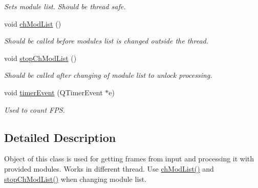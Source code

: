 \begin{DoxyCompactItemize}
\begin{DoxyCompactList}\small\item\em Sets module list. Should be thread safe. \item\end{DoxyCompactList}\item 
\hypertarget{class_image_processor_a76a8fc6e9f5e7f9883d69c5c0a607767}{
void \hyperlink{class_image_processor_a76a8fc6e9f5e7f9883d69c5c0a607767}{chModList} ()}
\label{de/d7d/class_image_processor_a76a8fc6e9f5e7f9883d69c5c0a607767}

\begin{DoxyCompactList}\small\item\em Should be called before modules list is changed outside the thread. \item\end{DoxyCompactList}\item 
\hypertarget{class_image_processor_aa9d00dfbeeda0eae7f59a6bdab0bc4d4}{
void \hyperlink{class_image_processor_aa9d00dfbeeda0eae7f59a6bdab0bc4d4}{stopChModList} ()}
\label{de/d7d/class_image_processor_aa9d00dfbeeda0eae7f59a6bdab0bc4d4}

\begin{DoxyCompactList}\small\item\em Should be called after changing of module list to unlock processing. \item\end{DoxyCompactList}\item 
void \hyperlink{class_image_processor_a5f2ec93ec8263d8adbc85078b7cf8593}{timerEvent} (QTimerEvent $\ast$e)
\begin{DoxyCompactList}\small\item\em Used to count FPS. \item\end{DoxyCompactList}\end{DoxyCompactItemize}


\subsection{Detailed Description}
Object of this class is used for getting frames from input and processing it with provided modules. Works in different thread. Use \hyperlink{class_image_processor_a76a8fc6e9f5e7f9883d69c5c0a607767}{chModList()} and \hyperlink{class_image_processor_aa9d00dfbeeda0eae7f59a6bdab0bc4d4}{stopChModList()} when changing module list. 

